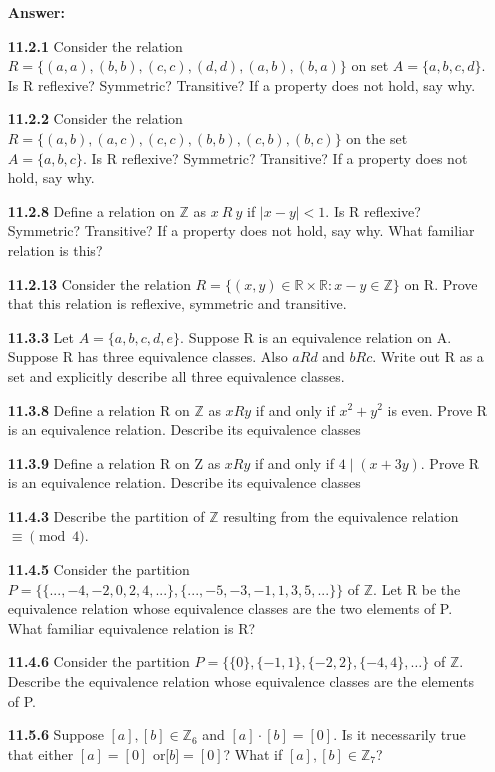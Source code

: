 \documentclass[11pt]{report}
\theoremstyle{plain}
\newcommand{\Z}{\mathbb{Z}}
\newcommand{\R}{\mathbb{R}}
\begin{document}
\begin{enumerate}
\textbf{Answer:} \\
\vspace{0.5in}
\item[\textbf{11.2.1}] Consider the relation $R =\{(a,a),(b,b),(c, c),(d,d),(a,b),(b,a)\}$ on set $A =\{a,b, c,d\}.$ Is R reflexive? Symmetric? Transitive? If a property does not hold, say why.
\item[\textbf{11.2.2}] Consider the relation $R =\{(a,b),(a, c),(c, c),(b,b),(c,b),(b, c)\}$ on the set $A = \{a,b, c\}.$ Is R reflexive? Symmetric? Transitive? If a property does not hold, say why.
\item[\textbf{11.2.8}] Define a relation on $\Z$ as $x\:R\: y$ if $|x- y| < 1.$ Is R reflexive? Symmetric? Transitive?
If a property does not hold, say why. What familiar relation is this?
\item[\textbf{11.2.13}] Consider the relation $R =\{(x, y) \in \R \times \R : x- y \in \Z\}$ on R. Prove that this relation is
reflexive, symmetric and transitive.
\item[\textbf{11.3.3}] Let $A =\{a,b, c,d, e\}.$ Suppose R is an equivalence relation on A. Suppose R has three equivalence classes. Also $aRd$ and $bRc.$ Write out R as a set and explicitly describe all three equivalence classes.
\item[\textbf{11.3.8}] Define a relation R on $\Z$ as $xR y$ if and only if $x^2+y^2$ is even. Prove R is an
equivalence relation. Describe its equivalence classes
\item[\textbf{11.3.9}] Define a relation R on Z as $xR y$ if and only if $4\mid (x+3y).$ Prove R is an equivalence
relation. Describe its equivalence classes
\item[\textbf{11.4.3}] Describe the partition of $\Z$ resulting from the equivalence relation $\equiv \pmod 4.$
\item[\textbf{11.4.5}] Consider the partition $P =\big\{ \{...,-4,-2,0,2,4,...\}, \{...,-5,-3,-1,1,3,5,...\} \big\}$ of $\Z.$
Let R be the equivalence relation whose equivalence classes are the two elements
of P. What familiar equivalence relation is R?
\item[\textbf{11.4.6}] Consider the partition $P =\big\{\{0\}, \{-1,1\}, \{-2,2\},\{-4,4\},\dots \big\}$ of $\Z.$ Describe
the equivalence relation whose equivalence classes are the elements of P.
\item[\textbf{11.5.6}] Suppose $[a],[b] \in \Z_6$ and $[a]\cdot [b] = [0].$ Is it necessarily true that either $[a] = [0]$ or[$b] = [0]$? What if $[a],[b] \in \Z_7$?

\end{enumerate}
\end{document}
